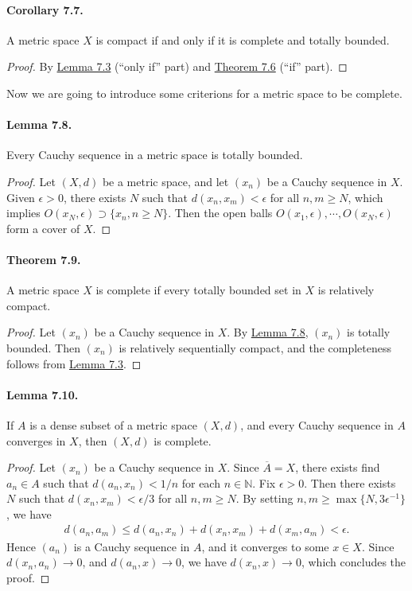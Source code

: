 \documentclass{article}
\numberwithin{equation}{section}
\theoremstyle{plain}
\theoremstyle{definition}
\begin{document}
\paragraph{Corollary 7.7.\label{cor:7.7}} A metric space $X$ is compact if and only if it is complete and totally bounded.
\begin{proof}
By \hyperref[lemma:7.3]{Lemma 7.3} (``only if'' part) and \hyperref[thm:7.6]{Theorem 7.6} (``if'' part).
\end{proof}

Now we are going to introduce some criterions for a metric space to be complete.
\paragraph{Lemma 7.8.\label{lemma:7.8}} Every Cauchy sequence in a metric space is totally bounded.
\begin{proof}
Let $(X,d)$ be a metric space, and let $(x_n)$ be a Cauchy sequence in $X$. Given $\epsilon > 0$, there exists $N$ such that $d(x_n,x_m)<\epsilon$ for all $n,m\geq N$, which implies $O(x_N,\epsilon)\supset\{x_n,n\geq N\}$. Then the open balls $O(x_1,\epsilon),\cdots,O(x_N,\epsilon)$ form a cover of $X$. 
\end{proof}

\paragraph{Theorem 7.9.\label{thm:7.9}} A metric space $X$ is complete if every totally bounded set in $X$ is relatively compact.
\begin{proof}
Let $(x_n)$ be a Cauchy sequence in $X$. By \hyperref[lemma:7.8]{Lemma 7.8}, $(x_n)$ is totally bounded. Then $(x_n)$ is relatively sequentially compact, and the completeness follows from \hyperref[lemma:7.3]{Lemma 7.3}.
\end{proof}

\paragraph{Lemma 7.10.\label{lemma:7.10}} If $A$ is a dense subset of a metric space $(X,d)$, and every Cauchy sequence in $A$ converges in $X$, then $(X,d)$ is complete.
\begin{proof}
Let $(x_n)$ be a Cauchy sequence in $X$. Since $\overline{A}=X$, there exists find $a_n\in A$ such that $d(a_n,x_n)<1/n$ for each $n\in\mathbb{N}$. Fix $\epsilon > 0$. Then there exists $N$ such that $d(x_n,x_m)<\epsilon/3$ for all $n,m\geq N$. By setting $n,m\geq\max\{N,3\epsilon^{-1}\}$, we have
\begin{align*}
	d(a_n,a_m) \leq d(a_n,x_n) + d(x_n,x_m) + d(x_m,a_m) < \epsilon.
\end{align*}
Hence $(a_n)$ is a Cauchy sequence in $A$, and it converges to some $x\in X$. Since $d(x_n,a_n)\to 0$, and $d(a_n,x)\to 0$, we have $d(x_n,x)\to 0$, which concludes the proof.
\end{proof}
\end{document}
